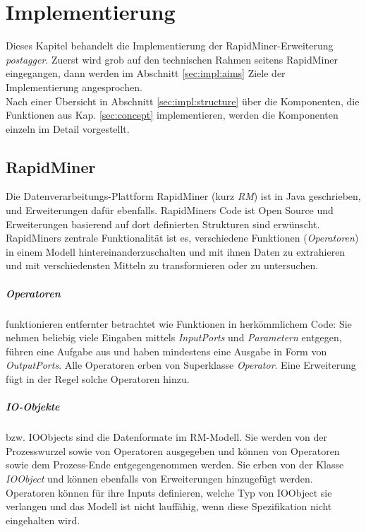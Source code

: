 %
\chapter{Implementierung}
\label{sec:impl}

Dieses Kapitel behandelt die Implementierung der RapidMiner-Erweiterung \textit{postagger}. Zuerst wird grob auf den technischen Rahmen seitens RapidMiner eingegangen, dann werden im Abschnitt \ref{sec:impl:aims} Ziele der Implementierung angesprochen. \\
Nach einer Übersicht in Abschnitt \ref{sec:impl:structure} über die Komponenten, die Funktionen aus Kap. \ref{sec:concept} implementieren, werden die Komponenten einzeln im Detail vorgestellt.

\section{RapidMiner}
\label{sec:impl:rm}


Die Datenverarbeitungs-Plattform RapidMiner (kurz \textit{RM}) ist in Java geschrieben, und Erweiterungen dafür ebenfalls. RapidMiners Code ist Open Source und Erweiterungen basierend auf dort definierten Strukturen sind erwünscht. RapidMiners zentrale Funktionalität ist es, verschiedene Funktionen (\textit{Operatoren}) in einem Modell hintereinanderzuschalten und mit ihnen Daten zu extrahieren und mit verschiedensten Mitteln zu transformieren oder zu untersuchen.

\paragraph{Operatoren} 
funktionieren entfernter betrachtet wie Funktionen in herkömmlichem Code: Sie nehmen beliebig viele Eingaben mittels \textit{InputPorts} und \textit{Parametern} entgegen, führen eine Aufgabe aus und haben mindestens eine Ausgabe in Form von \textit{OutputPorts}. Alle Operatoren erben von Superklasse \textit{Operator}. Eine Erweiterung fügt in der Regel solche Operatoren hinzu.
\paragraph{IO-Objekte}
bzw. IOObjects sind die Datenformate im RM-Modell. Sie werden von der Prozesswurzel sowie von Operatoren ausgegeben und können von Operatoren sowie dem Prozess-Ende entgegengenommen werden. Sie erben von der Klasse \textit{IOObject} und können ebenfalls von Erweiterungen hinzugefügt werden. Operatoren können für ihre Inputs definieren, welche Typ von IOObject sie verlangen und das Modell ist nicht lauffähig, wenn diese Spezifikation nicht eingehalten wird.

